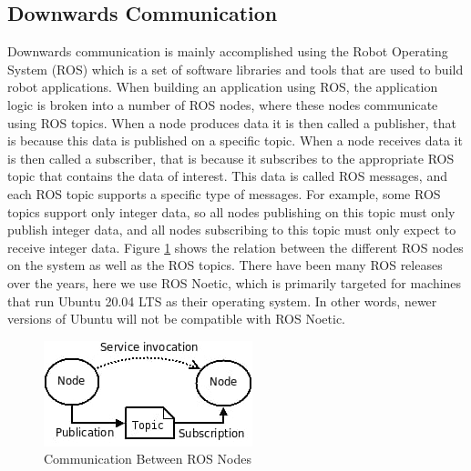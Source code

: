 \subsection{Downwards Communication}
Downwards communication is mainly accomplished using the Robot Operating System (ROS) which is a set of software libraries and tools that are used to build robot applications\cite{ros_documentation}. 
\newpage
When building an application using ROS, the application logic is broken into a number of ROS nodes, where these nodes communicate using ROS topics. When a node produces data it is then called a publisher, that is because this data is published on a specific topic. When a node receives data it is then called a subscriber, that is because it subscribes to the appropriate ROS topic that contains the data of interest. This data is called ROS messages, and each ROS topic supports a specific type of messages. For example, some ROS topics support only integer data, so all nodes publishing on this topic must only publish integer data, and all nodes subscribing to this topic must only expect to receive integer data. Figure \ref{fig:ros_arch_official} shows the relation between the different ROS nodes on the system as well as the ROS topics\cite{ros_documentation}. There have been many ROS releases over the years, here we use ROS Noetic, which is primarily targeted for machines that run Ubuntu 20.04 LTS as their operating system. In other words, newer versions of Ubuntu will not be compatible with ROS Noetic.
\begin{figure}[h!]
	\centering
	\includegraphics[scale=0.8]{./Figures/CentralProcessingNode/UsedToolsAndFrameworks/Ros-images/ros-arch-official.jpeg}
	\caption{Communication Between ROS Nodes}
	\label{fig:ros_arch_official}
\end{figure}


